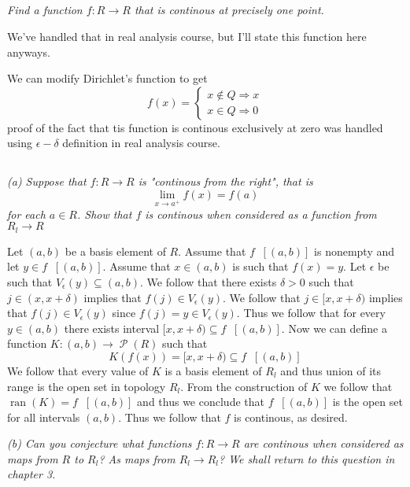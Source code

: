 \documentclass[11pt,oneside,titlepage]{book}
\DeclareMathOperator \pow {\mathcal {P}}
\DeclareMathOperator \inv {^{-1}}
\DeclareMathOperator \ra {\Rightarrow}
\DeclareMathOperator \ran {ran}
\begin{document}
\subsection{}

\textit{Find a function $f: R \to R$ that is continous at precisely one point.}

We've handled that in real analysis course, but I'll state this function here anyways.

We can modify Dirichlet's function to get
$$f(x) =
\begin{cases}
  x \notin Q \ra x \\
  x \in Q \ra 0
\end{cases}
$$
proof of the fact that tis function is continous exclusively at zero was handled
using $\epsilon-\delta$ definition in real analysis course.

\subsection{}

\textit{(a) Suppose that $f: R \to R$ is "continous from the right", that is 
$$\lim_{x \to a^+}f(x) = f(a)$$
for each $a \in R$. Show that $f$ is continous when considered as a function from $R_l \to R$}

Let $(a, b)$ be a basis element of $R$. Assume that $f\inv[(a, b)]$ is nonempty and
let $y \in f\inv[(a, b)]$. Assume that $x \in (a, b)$ is such that $f(x) = y$.
Let $\epsilon$ be such that $V_\epsilon(y) \subseteq (a, b)$. We follow that
there exists $\delta > 0$ such that $j \in (x, x + \delta)$ implies that $f(j) \in V_\epsilon(y)$.
We follow that $j \in [x, x + \delta)$ implies that $f(j) \in V_\epsilon(y)$ since
$f(j) = y \in V_\epsilon(y)$. Thus we follow that for every $y \in (a, b)$ there exists
interval $[x, x + \delta) \subseteq f\inv[(a, b)]$. Now we can define a function
$K: (a, b) \to \pow(R)$ such that
$$K(f(x)) = [x, x + \delta) \subseteq f\inv[(a, b)]$$
We follow that every value of $K$ is a basis element of $R_l$ and thus union of its range
is the open set in topology $R_l$. From the construction of $K$ we follow that
$\ran(K) = f\inv[(a, b)]$ and thus we conclude that $f\inv[(a, b)]$ is the open set
for all intervals $(a, b)$. Thus we follow that $f$ is continous, as desired.

\textit{(b) Can you conjecture what functions $f: R \to R$ are continous when
  considered as maps from $R$ to $R_l$? As maps from $R_l \to R_l$?
  We shall return to this question in chapter 3.}
\end{document}
